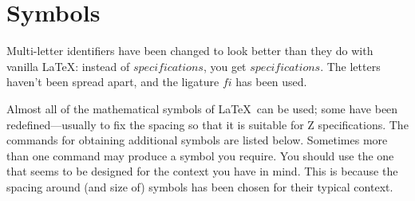 \documentclass[a4paper]{article}
\begin{document}
\section{Symbols}

Multi-letter identifiers have been changed to look
better than they do with vanilla \LaTeX: instead of
$\mathit{specifications}$, you get $specifications$.
The letters haven't been spread apart, and the
ligature $fi$ has been used.

Almost all of the mathematical symbols of \LaTeX\ can be used;
some have been redefined---usually to fix the spacing so that it is
suitable for Z specifications.
The commands for obtaining additional symbols are listed below.
Sometimes more than one command may produce a symbol you
require.  You should use the one that seems to be designed for the
context you have in mind.  This is because the spacing around (and size of)
symbols has been chosen for their typical context.
\end{document}
